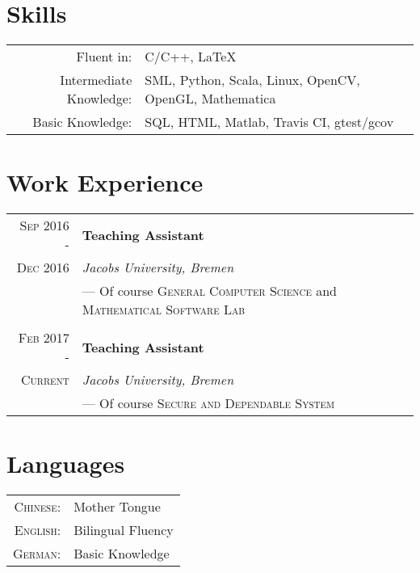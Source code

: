 \documentclass[a4paper,10pt]{article}
\begin{document}
	
	\section{Skills}
	\begin{tabular}{rl}
		Fluent in: & C/C++, LaTeX\\
		Intermediate Knowledge:& SML, Python, Scala, Linux, OpenCV, OpenGL, Mathematica\\
		Basic Knowledge:& SQL, HTML, Matlab, Travis CI, gtest/gcov \\
	\end{tabular}
	
	
	
	\section{Work Experience}
	\begin{tabular}{r|l}
		\textsc{Sep 2016 - } & \textbf{Teaching Assistant} \\\textsc{Dec 2016}&\emph{Jacobs University, Bremen}
		\\& --- Of course \textsc{General Computer Science} and \textsc{Mathematical Software Lab} 
		\\ \multicolumn{2}{c}{} \\
		\textsc{Feb 2017 - } & \textbf{Teaching Assistant} \\\textsc{Current}&\emph{Jacobs University, Bremen}
		\\& --- Of course \textsc{Secure and Dependable System}
	\end{tabular}
	
	\section{Languages}
	\begin{tabular}{rl}
		\textsc{Chinese:}& Mother Tongue\\
		\textsc{English:}& Bilingual Fluency\\
		\textsc{German:}& Basic Knowledge\\
	\end{tabular}
	
\end{document}
